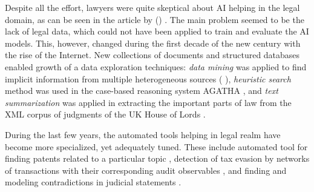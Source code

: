 \documentclass[
  digital, %
  notable,   %
  nolof,     %
  nolot,     %
]{fithesis3}
\begin{document}
Despite all the effort, lawyers were quite skeptical about AI helping in the legal domain, as can be seen in the article  by \citeauthor{oskamp2002ainotsomuch} (\citeyear{oskamp2002ainotsomuch}) \cite{oskamp2002ainotsomuch}.
The main problem seemed to be the lack of legal data, which could not have been applied to train and evaluate the AI models.
This, however, changed during the first decade of the new century with the rise of the Internet.
New collections of documents and structured databases enabled growth of a data exploration techniques:
\textit{data mining} was applied to find implicit information from multiple heterogeneous sources ( \cite{Dahbur2003crimes}), \textit{heuristic search} method was used in the case-based reasoning system AGATHA \cite{Chorley2005agatha}, and \textit{text summarization} was applied in extracting the important parts of law from the XML corpus of judgments of the UK House of Lords \cite{Hachey2006summarization}.

During the last few years, the automated tools helping in legal realm have become more specialized, yet adequately tuned.
These include automated tool for finding patents related to a particular topic \cite{Abood2018patent}, detection of tax evasion by networks of transactions with their corresponding audit observables \cite{Hemberg2016tax}, and finding and modeling contradictions in judicial statements \cite{Carey2013contradiction} \cite{marneffe2008contradiction}.
\end{document}
